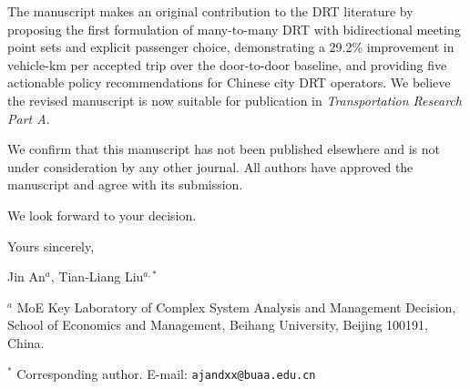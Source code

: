 \documentclass[12pt]{article}
\begin{document}
The manuscript makes an original contribution to the DRT literature by proposing the first formulation of many-to-many DRT with bidirectional meeting point sets and explicit passenger choice, demonstrating a 29.2\% improvement in vehicle-km per accepted trip over the door-to-door baseline, and providing five actionable policy recommendations for Chinese city DRT operators. We believe the revised manuscript is now suitable for publication in \textit{Transportation Research Part A}.

We confirm that this manuscript has not been published elsewhere and is not under consideration by any other journal. All authors have approved the manuscript and agree with its submission.

We look forward to your decision.

\bigskip

\noindent Yours sincerely,

\bigskip\bigskip

\noindent Jin An$^{a}$, Tian-Liang Liu$^{a,*}$

\medskip

\noindent $^{a}$ MoE Key Laboratory of Complex System Analysis and Management Decision,\\
School of Economics and Management, Beihang University, Beijing 100191, China.

\noindent $^{*}$ Corresponding author. E-mail: \texttt{ajandxx@buaa.edu.cn}
\end{document}
